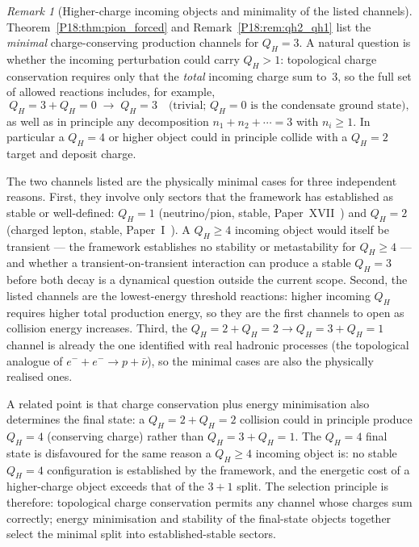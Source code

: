 \documentclass[11pt,a4paper]{article}
\theoremstyle{definition}\newtheorem{definition}[theorem]{Definition}
\theoremstyle{remark}
\newtheorem{remark}[theorem]{Remark}
\newcommand{\QH}{Q_H}
\begin{document}
\begin{remark}[Higher-charge incoming objects and minimality of the listed channels]
\label{P18:rem:higher_charge_incoming}
Theorem~\ref{P18:thm:pion_forced} and Remark~\ref{P18:rem:qh2_qh1} list the
\emph{minimal} charge-conserving production channels for $\QH=3$.
A natural question is whether the incoming perturbation could carry
$\QH>1$: topological charge conservation requires only that the
\emph{total} incoming charge sum to~$3$, so the full set of allowed
reactions includes, for example,
\[
  \QH=3 + \QH=0 \;\to\; \QH=3
  \quad\text{(trivial; } \QH=0 \text{ is the condensate ground state)},
\]
as well as in principle any decomposition $n_1+n_2+\cdots=3$ with
$n_i\geq1$.  In particular a $\QH=4$ or higher object could in
principle collide with a $\QH=2$ target and deposit charge.

The two channels listed are the physically minimal cases for three
independent reasons.  First, they involve only sectors that the
framework has established as stable or well-defined: $\QH=1$
(neutrino/pion, stable, Paper~XVII~\cite{Paper17}) and $\QH=2$
(charged lepton, stable, Paper~I~\cite{Paper1}).  A $\QH\geq4$
incoming object would itself be transient --- the framework
establishes no stability or metastability for $\QH\geq4$ --- and
whether a transient-on-transient interaction can produce a
stable $\QH=3$ before both decay is a dynamical question outside
the current scope.  Second, the listed channels are the
lowest-energy threshold reactions: higher incoming $\QH$ requires
higher total production energy, so they are the first channels to
open as collision energy increases.  Third, the
$\QH=2+\QH=2\to\QH=3+\QH=1$ channel is already the one identified
with real hadronic processes (the topological analogue of
$e^-+e^-\to p+\bar\nu$), so the minimal cases are also the
physically realised ones.

A related point is that charge conservation plus energy minimisation
also determines the final state: a $\QH=2+\QH=2$ collision could
in principle produce $\QH=4$ (conserving charge) rather than
$\QH=3+\QH=1$.  The $\QH=4$ final state is disfavoured for the same
reason a $\QH\geq4$ incoming object is: no stable $\QH=4$
configuration is established by the framework, and the energetic cost
of a higher-charge object exceeds that of the $3+1$ split.  The
selection principle is therefore: topological charge conservation
permits any channel whose charges sum correctly; energy minimisation
and stability of the final-state objects together select the minimal
split into established-stable sectors.
\end{remark}
\end{document}

